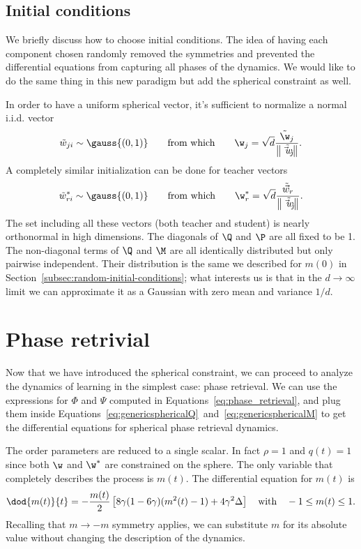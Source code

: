 \subsection{Initial conditions} \label{subsec:initial-condition-phaseretrivial}
We briefly discuss how to choose initial conditions.
The idea of having each component chosen randomly removed the symmetries and prevented the differential equations from capturing all phases of the dynamics.
We would like to do the same thing in this new paradigm but add the spherical constraint as well.

In order to have a uniform spherical vector, it's sufficient to normalize a normal i.i.d. vector
\[
  \tilde{w}_{ji} \sim \gauss{(0,1)}\qquad\text{from which}\qquad \w_{j} = \sqrt{d}\frac{\tilde{\w}_{j}}{\left\|\tilde{\vec{w}_j}\right\|}.
\]
A completely similar initialization can be done for teacher vectors
\[
  \tilde{w}^*_{ri} \sim \gauss{(0,1)}\qquad\text{from which}\qquad \w^*_{r} = \sqrt{d}\frac{\tilde{\vec{w}}_{r}}{\left\|\tilde{\vec{w}_j}\right\|}.
\]
The set including all these vectors (both teacher and student) is nearly orthonormal in high dimensions.
The diagonals of \(\Q\) and \(\P\) are all fixed to be 1. The non-diagonal terms of \(\Q\) and \(\M\) are all identically
distributed but only pairwise independent. Their distribution is the same we described for \(m(0)\) in Section~\ref{subsec:random-initial-conditions};
what interests us is that in the \(d\to\infty\) limit we can approximate it as a Gaussian with zero mean and variance \(1/d\).

\section{Phase retrivial} \label{sec:spherical_phase_retrivial}
Now that we have introduced the spherical constraint,
we can proceed to analyze the dynamics of learning in the simplest case: phase retrieval.
We can use the expressions for \(\Phi\) and \(\Psi\) computed in Equations~\eqref{eq:phase_retrieval},
and plug them inside Equations~\eqref{eq:genericsphericalQ}~and~\eqref{eq:genericsphericalM} to get the 
differential equations for spherical phase retrieval dynamics.

The order parameters are reduced to a single scalar.
In fact \(\rho=1\) and \(q(t)=1\) since both \(\w\) and \(\w^*\) are constrained on the sphere.
The only variable that completely describes the process is \(m(t)\).
The differential equation for \(m(t)\) is
\begin{equation} \label{eq:spherical-phaseretrivial}
  \dod{m{(t)}}{t} = -\frac{m{(t)}}{2}\left[8\gamma(1-6\gamma)(m^2{(t)}-1)+4\gamma^2\Delta\right]\quad\text{with}\quad
  -1\le m(t)\le 1.
\end{equation}
Recalling that \(m\to-m\) symmetry applies,
we can substitute \(m\) for its absolute value without changing the description of the dynamics.

